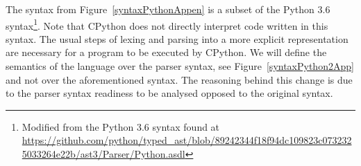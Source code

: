 %
%
%
%
%
%
%
%

The syntax from Figure~\ref{syntaxPythonAppen} is a subset of the Python 3.6 syntax\footnote{%
  Modified from the Python 3.6 syntax found at
  \url{https://github.com/python/typed_ast/blob/89242344f18f94dc109823c0732325033264e22b/ast3/Parser/Python.asdl}
}. Note that CPython does not directly interpret code written in this syntax. The usual
steps of lexing and parsing into a more explicit representation are necessary for a
program to be executed by CPython. We will define the semantics of the language over the
parser syntax, see Figure~\ref{syntaxPython2App} and not over the aforementioned syntax. The reasoning behind this change
is due to the parser syntax readiness to be analysed opposed to the original syntax.

